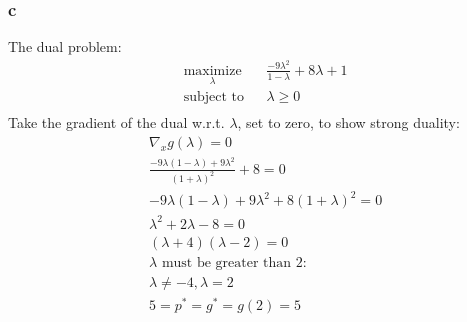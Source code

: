 \documentclass[12pt]{article}
\begin{document}
\subsubsection*{c}
The dual problem:
\begin{equation*}
\begin{aligned}
& \underset{\lambda}{\text{maximize}}
& & \frac{-9\lambda^2}{1-\lambda} + 8\lambda + 1\\
& \text{subject to}
& & \lambda \ge 0\\
\end{aligned}
\end{equation*}
Take the gradient of the dual w.r.t. $\lambda$, set to zero, to show strong duality:\\
\begin{equation*}
\begin{aligned}
& \nabla_x g(\lambda) = 0\\
& \frac{-9\lambda (1-\lambda)+9\lambda^2}{(1+\lambda)^2} + 8 = 0\\
& -9\lambda (1-\lambda)+9\lambda^2 + 8(1+\lambda)^2 = 0\\
& \lambda^2 + 2\lambda - 8 = 0\\
& (\lambda + 4)(\lambda - 2) = 0\\
& \text{$\lambda$ must be greater than 2:}\\
& \lambda \not= -4, \lambda = 2\\
& 5 = p^* = g^* = g(2) = 5 
\end{aligned}
\end{equation*}
\end{document}
